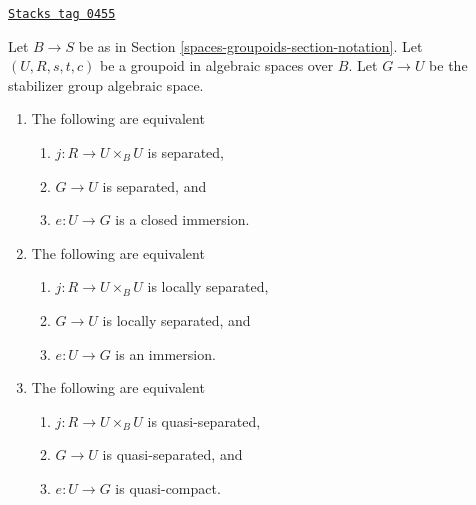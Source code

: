 \begin{lemma}[Diagonal]
\label{spaces-groupoids-lemma-diagonal}
\href{https://stacks.math.columbia.edu/tag/0455}{\texttt{Stacks tag 0455}}

Let $B \to S$ be as in Section \ref{spaces-groupoids-section-notation}.
Let $(U, R, s, t, c)$ be a groupoid in algebraic spaces over $B$.
Let $G \to U$ be the stabilizer group algebraic space.
\begin{enumerate}
\item The following are equivalent
\begin{enumerate}
\item $j : R \to U \times_B U$ is separated,
\item $G \to U$ is separated, and
\item $e : U \to G$ is a closed immersion.
\end{enumerate}
\item The following are equivalent
\begin{enumerate}
\item $j : R \to U \times_B U$ is locally separated,
\item $G \to U$ is locally separated, and
\item $e : U \to G$ is an immersion.
\end{enumerate}
\item The following are equivalent
\begin{enumerate}
\item $j : R \to U \times_B U$ is quasi-separated,
\item $G \to U$ is quasi-separated, and
\item $e : U \to G$ is quasi-compact.
\end{enumerate}
\end{enumerate}
\end{lemma}


